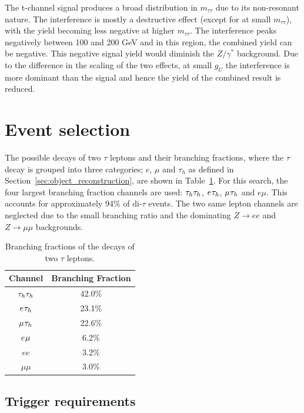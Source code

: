 The t-channel signal produces a broad distribution in $m_{\tau\tau}$ due to its non-resonant nature.
The interference is mostly a destructive effect (except for at small $m_{\tau\tau}$), with the yield becoming less negative at higher $m_{\tau\tau}$.
The interference peaks negatively between 100 and 200 GeV and in this region, the combined yield can be negative.
This negative signal yield would diminish the $Z/\gamma^{*}$ background.
Due to the difference in the scaling of the two effects, at small $g_{U}$ the interference is more dominant than the signal and hence the yield of the combined result is reduced.

\section{Event selection}

The possible decays of two $\tau$ leptons and their branching fractions, where the $\tau$ decay is grouped into three categories; $e$, $\mu$ and $\tau_h$ as defined in Section~\ref{sec:object_reconstruction}, are shown in Table~\ref{tab:ditau_br}. 
For this search, the four largest branching fraction channels are used: $\tau_{h}\tau_{h}$, $e_{}\tau_{h}$, $\mu_{}\tau_{h}$ and $e\mu$.
This accounts for approximately 94\% of di-$\tau$ events.
The two same lepton channels are neglected due to the small branching ratio and the dominating $Z\rightarrow ee$ and $Z\rightarrow \mu\mu$ backgrounds. \\

\begin{table}[!hbtp]
    \centering
    \begin{tabular}{|c|c|}
         \hline
         Channel & Branching Fraction  \\
         \hline
         \hline
         $\tau_{h}\tau_{h}$ & 42.0\% \\
         $e_{}\tau_{h}$ & 23.1\% \\
         $\mu_{}\tau_{h}$ & 22.6\% \\
         $e_{}\mu_{}$ & 6.2\% \\
         $e e$ & 3.2\% \\
         $\mu \mu$ & 3.0\% \\
         \hline
    \end{tabular}
    \caption[Branching fractions of the decays of two $\tau$ leptons.]{Branching fractions of the decays of two $\tau$ leptons.}
    \label{tab:ditau_br}
\end{table}

\subsection{Trigger requirements}
\label{sec:trig_ditau}

